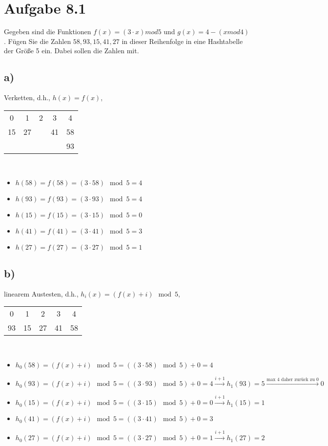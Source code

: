 \documentclass[a4paper]{article}
\begin{document}
\section*{Aufgabe 8.1}
Gegeben sind die Funktionen $f (x) = (3 \cdot x) mod 5$ und $g(x) = 4 - (x mod 4)$. Fügen Sie die Zahlen $58, 93, 15, 41, 27$ in dieser Reihenfolge in eine Hashtabelle der Größe 5 ein. Dabei sollen die Zahlen mit.

\subsection*{a)}
Verketten, d.h., $h(x) = f (x)$,\\

\begin{tabular}{c|c|c|c|c}
     0 & 1 & 2 & 3 & 4 \\
     15 & 27 &  & 41 & 58 \\
     & & & & 93
\end{tabular}\\
\begin{itemize}
    \item $h(58) = f(58) = (3 \cdot 58) \mod 5 = 4$\\
    \item $h(93) = f(93) = (3 \cdot 93) \mod 5 = 4$\\
    \item $h(15) = f(15) = (3 \cdot 15) \mod 5 = 0$\\
    \item $h(41) = f(41) = (3 \cdot 41) \mod 5 = 3$\\
    \item $h(27) = f(27) = (3 \cdot 27) \mod 5 = 1$\\
\end{itemize}

\subsection*{b)}
linearem Austesten, d.h., $h_i(x) = (f (x) + i) \mod 5$,\\

\begin{tabular}{c|c|c|c|c}
     0 & 1 & 2 & 3 & 4 \\
     93 & 15 & 27 & 41 & 58
\end{tabular}\\

\begin{itemize}
    \item $h_0(58) = (f(x) + i) \mod 5 = ((3 \cdot 58) \mod 5) + 0 = 4$
    \item $h_0(93) = (f(x) + i) \mod 5 = ((3 \cdot 93) \mod 5) + 0 = 4 \xrightarrow{i + 1} h_1(93) = 5 \xrightarrow{\text{max 4 daher zurück zu 0}} 0$
    \item $h_0(15) = (f(x) + i) \mod 5 = ((3 \cdot 15) \mod 5) + 0 = 0 \xrightarrow{i + 1} h_1(15) = 1$
    \item $h_0(41) = (f(x) + i) \mod 5 = ((3 \cdot 41) \mod 5) + 0 = 3$
    \item $h_0(27) = (f(x) + i) \mod 5 = ((3 \cdot 27) \mod 5) + 0 = 1 \xrightarrow{i + 1} h_1(27) = 2$
\end{itemize}
\end{document}
